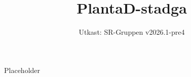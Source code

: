 \documentclass[a4paper]{dtek}
\title{PlantaD-stadga}
\date{Utkast: SR-Gruppen v2026.1-pre4}
\begin{document}
Placeholder
\end{document}
